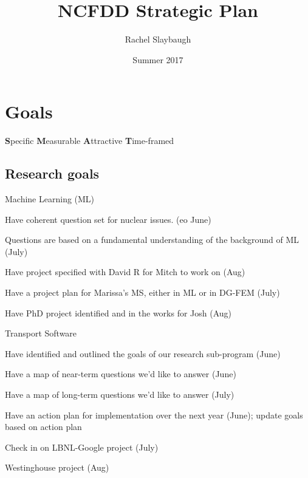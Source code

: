 \documentclass[12pt,twoside]{article}
\date{Summer 2017}
\title{NCFDD Strategic Plan}
\author{Rachel Slaybaugh}
\begin{document}
\maketitle

\section{Goals}
\textbf{S}pecific \textbf{M}easurable \textbf{A}ttractive \textbf{T}ime-framed

\subsection{Research goals}
\begin{compactitem}
\item Machine Learning (ML)
  \begin{compactitem}
  \item Have coherent question set for nuclear issues. (eo June)
  \item Questions are based on a fundamental understanding of the background of ML (July)
  \item Have project specified with David R for Mitch to work on (Aug)
  \end{compactitem}
\item Have a project plan for Marissa's MS, either in ML or in DG-FEM (July)
\item Have PhD project identified and in the works for Josh (Aug)
\item Transport Software
  \begin{compactitem}
  \item Have identified and outlined the goals of our research sub-program (June)
  \item Have a map of near-term questions we'd like to answer (June)
  \item Have a map of long-term questions we'd like to answer (July)
  \item Have an action plan for implementation over the next year (June); update goals based on action plan
  \end{compactitem}
\item Check in on LBNL-Google project (July)
\item Westinghouse project (Aug)
\end{compactitem}
\end{document}
